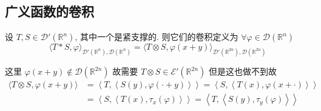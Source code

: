\documentclass[11pt]{ctexart}[UTF8]
\begin{document}
\subsection{广义函数的卷积}
\begin{definition}
    设 $T, S \in \mathscr{D}'(\mathbb{R}^{n})$, 其中一个是紧支撑的. 则它们的卷积定义为 $\forall \varphi \in \mathscr{D}(\mathbb{R}^{n})$
    \begin{equation*}
        \langle T * S, \varphi \rangle_{\mathscr{D}'(\mathbb{R}^{n}), \mathscr{D}(\mathbb{R}^{n})} = \langle T \otimes S, \varphi(x+y) \rangle_{\mathscr{D}'(\mathbb{R}^{2n}), \mathscr{D}(\mathbb{R}^{2n})}
    \end{equation*}
\end{definition}
\begin{remark}
    这里 $\varphi(x+y) \notin \mathscr{D}(\mathbb{R}^{2n})$ 故需要 $T \otimes S \in \mathscr{E}'(\mathbb{R}^{2n})$ 但是这也做不到故
    \begin{equation}\label{convolution of distribution}
        \begin{aligned}
                    \langle T \otimes S, \varphi(x+y) \rangle & = \left\langle T, \left\langle S(y), \varphi(\cdot+y) \right\rangle \right\rangle = \left\langle S, \left\langle T(x), \varphi(x+\cdot) \right\rangle \right\rangle \\
                                                              & = \left\langle S, \left\langle T(x), \tau_{x}(\varphi) \right\rangle \right\rangle = \left\langle T, \left\langle S(y), \tau_{y}(\varphi) \right\rangle \right\rangle
        \end{aligned}
    \end{equation}
\end{remark}
\end{document}
